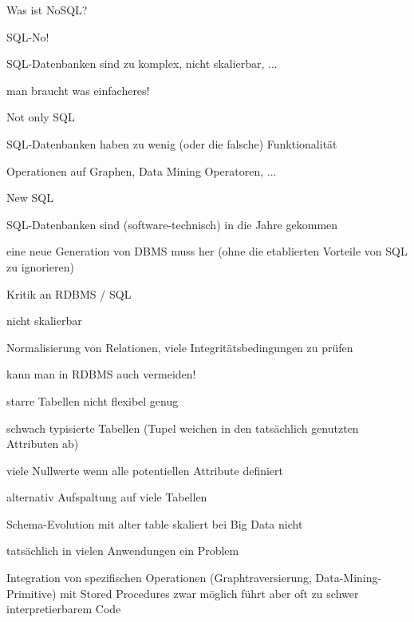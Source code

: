\documentclass[a4paper]{article}
\begin{document}
\begin{multicols}{3}
\begin{itemize*}
        Was ist NoSQL?
        \begin{itemize*}
            \item SQL-No!
            \begin{itemize*}
                \item SQL-Datenbanken sind zu komplex, nicht skalierbar, ...
                \item man braucht was einfacheres!
            \end{itemize*}
            \item Not only SQL
            \begin{itemize*}
                \item SQL-Datenbanken haben zu wenig (oder die falsche) Funktionalität
                \item Operationen auf Graphen, Data Mining Operatoren, ...
            \end{itemize*}
            \item New SQL
            \begin{itemize*}
                \item SQL-Datenbanken sind (software-technisch) in die Jahre gekommen
                \item eine neue Generation von DBMS muss her (ohne die etablierten Vorteile von SQL zu ignorieren)
            \end{itemize*}
        \end{itemize*}

        Kritik an RDBMS / SQL
        \begin{itemize*}
            \item nicht skalierbar
            \begin{itemize*}
                \item Normalisierung von Relationen, viele Integritätsbedingungen zu prüfen
                \item kann man in RDBMS auch vermeiden!
            \end{itemize*}
            \item starre Tabellen nicht flexibel genug
            \begin{itemize*}
                \item schwach typisierte Tabellen (Tupel weichen in den tatsächlich genutzten Attributen ab)
                \item viele Nullwerte wenn alle potentiellen Attribute definiert
                \item alternativ Aufspaltung auf viele Tabellen
                \item Schema-Evolution mit alter table skaliert bei Big Data nicht
                \item tatsächlich in vielen Anwendungen ein Problem
            \end{itemize*}
            \item Integration von spezifischen Operationen (Graphtraversierung, Data-Mining-Primitive) mit Stored Procedures zwar möglich führt aber oft zu schwer interpretierbarem Code
        \end{itemize*}



\end{itemize*}
\end{multicols}
\end{document}
